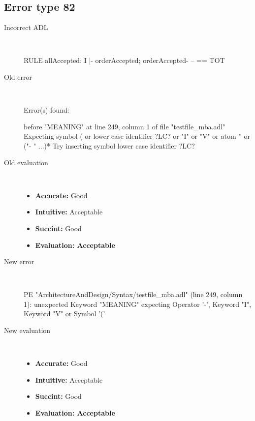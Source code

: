 \subsection{Error type 82}
  \begin{description}
  \item[Incorrect ADL]~\\
\begin{adl}
RULE allAccepted: I |- orderAccepted; orderAccepted- -- == TOT\end{adl}
  \item[Old error]~\\
\begin{haskell}
Error(s) found:

before "MEANING" at line 249, column 1 of file "testfile_mba.adl"
Expecting symbol ( or lower case identifier ?LC? or "I" or "V" or atom '' or ("-
" ...)*
Try inserting symbol lower case identifier ?LC?
\end{haskell}
  \item[Old evaluation]~\\
    \begin{itemize}
    \item \textbf{Accurate:} Good
    \item \textbf{Intuitive:} Acceptable
    \item \textbf{Succint:} Good
    \item \textbf{Evaluation: Acceptable}
    \end{itemize}
  \item[New error]~\\
\begin{haskell}
PE "ArchitectureAndDesign/Syntax/testfile_mba.adl" (line 249, column 1):
unexpected Keyword "MEANING"
expecting Operator '-', Keyword "I", Keyword "V" or Symbol '('\end{haskell}
  \item[New evaluation]~\\
    \begin{itemize}
    \item \textbf{Accurate:} Good
    \item \textbf{Intuitive:} Acceptable
    \item \textbf{Succint:} Good
    \item \textbf{Evaluation: Acceptable
}
    \end{itemize}
  \end{description}

\hrulefill

